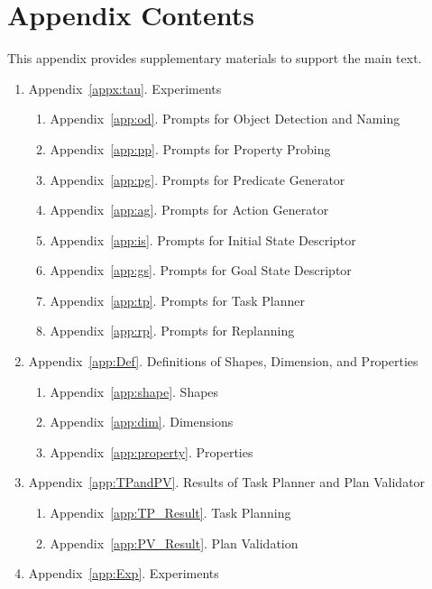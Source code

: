 \setcounter{page}{1}
\setcounter{secnumdepth}{3}
\section*{Appendix Contents}
This appendix provides supplementary materials to support the main text. 

\begin{enumerate}
  \item Appendix~\ref{appx:tau}. Experiments
  \begin{enumerate}
    \item Appendix~\ref{app:od}. Prompts for Object Detection and Naming 
    \item Appendix~\ref{app:pp}. Prompts for Property Probing 
    \item Appendix~\ref{app:pg}. Prompts for Predicate Generator 
    \item Appendix~\ref{app:ag}. Prompts for Action Generator 
    \item Appendix~\ref{app:is}. Prompts for Initial State Descriptor 
    \item Appendix~\ref{app:gs}. Prompts for Goal State Descriptor 
    \item Appendix~\ref{app:tp}. Prompts for Task Planner 
    \item Appendix~\ref{app:rp}. Prompts for Replanning 
  \end{enumerate}
  \vspace{5pt}
  \item Appendix~\ref{app:Def}. Definitions of Shapes, Dimension, and Properties
  \begin{enumerate}
    \item Appendix~\ref{app:shape}. Shapes
    \item Appendix~\ref{app:dim}. Dimensions
    \item Appendix~\ref{app:property}. Properties
  \end{enumerate}
  \vspace{5pt}
  \item Appendix~\ref{app:TPandPV}. Results of Task Planner and Plan Validator 
  \begin{enumerate}
    \item Appendix~\ref{app:TP_Result}. Task Planning
    \item Appendix~\ref{app:PV_Result}. Plan Validation
  \end{enumerate}
  \vspace{5pt}
  \item Appendix~\ref{app:Exp}. Experiments

\end{enumerate}
